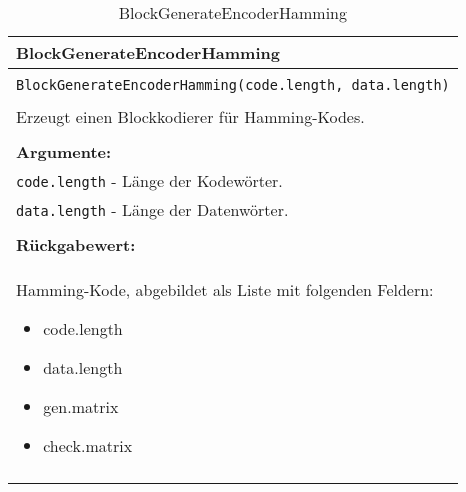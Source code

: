 \begin{longtable}{|p{\textwidth}|}
\hline
\rowcolor{lightblue}
BlockGenerateEncoderHamming
\\
\hline
\\
\texttt{BlockGenerateEncoderHamming(code.length, data.length)}\\
\\
Erzeugt einen Blockkodierer für Hamming-Kodes.\\
\\
\textbf{Argumente:}\\
\texttt{code.length} - Länge der Kodewörter.\\
\texttt{data.length} - Länge der Datenwörter.\\
\\
\textbf{Rückgabewert:}\\
Hamming-Kode, abgebildet als Liste mit folgenden Feldern:
\vspace{-4mm}
\begin{itemize}
\renewcommand\labelitemi{--}
\itemsep-.5em %
\item code.length
\item data.length
\item gen.matrix
\item check.matrix
\end{itemize}
\\
\hline
\caption{BlockGenerateEncoderHamming}
\end{longtable}
